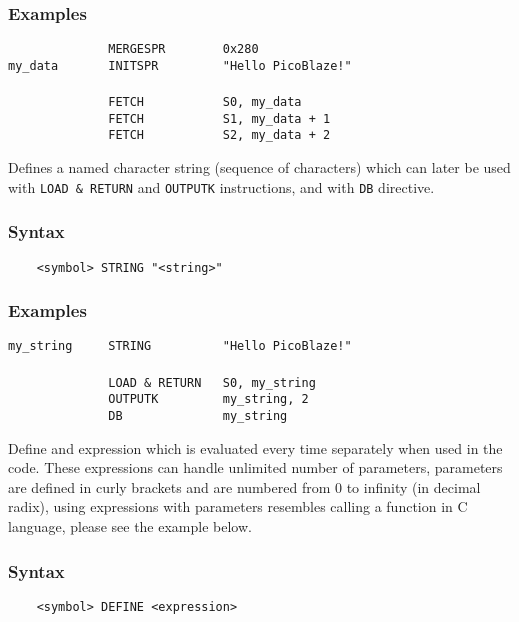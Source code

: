     \subsubsection{Examples}
        \verb'              MERGESPR        0x280'\\
        \verb'my_data       INITSPR         "Hello PicoBlaze!"'\\
        \verb''\\
        \verb'              FETCH           S0, my_data'\\
        \verb'              FETCH           S1, my_data + 1'\\
        \verb'              FETCH           S2, my_data + 2'

    Defines a named character string (sequence of characters) which can later be used with \texttt{LOAD \& RETURN} and \texttt{OUTPUTK} instructions, and with \texttt{DB} directive.

    \subsubsection{Syntax}
        \verb'    <symbol> STRING "<string>"'

    \subsubsection{Examples}
        \verb'my_string     STRING          "Hello PicoBlaze!"'\\
        \verb''\\
        \verb'              LOAD & RETURN   S0, my_string'\\
        \verb'              OUTPUTK         my_string, 2'\\
        \verb'              DB              my_string'

    Define and expression which is evaluated every time separately when used in the code. These expressions can handle unlimited number of parameters, parameters are defined in curly brackets and are numbered from 0 to infinity (in decimal radix), using expressions with parameters resembles calling a function in C language, please see the example below.

    \subsubsection{Syntax}
        \verb'    <symbol> DEFINE <expression>'

